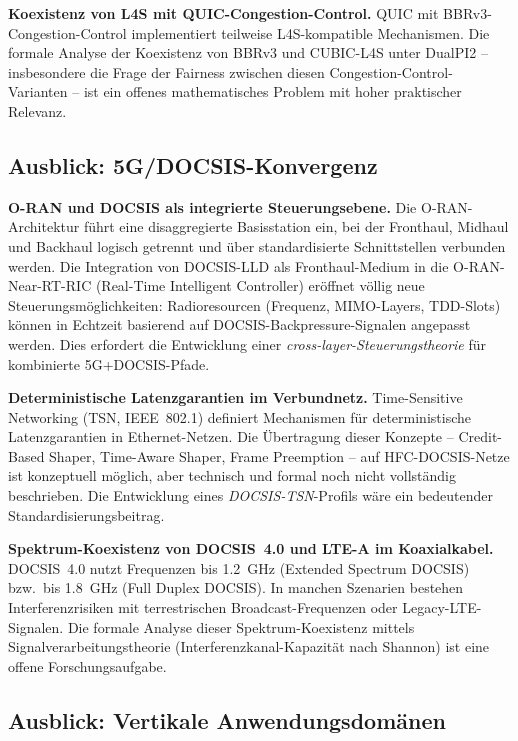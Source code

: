 ﻿\documentclass[a4paper,12pt]{article}
\theoremstyle{definition}
\begin{document}
\textbf{Koexistenz von L4S mit QUIC-Congestion-Control.}
QUIC \cite{iyengar2021rfc9000} mit BBRv3-Congestion-Control implementiert
teilweise L4S-kompatible Mechanismen. Die formale Analyse der Koexistenz
von BBRv3 und CUBIC-L4S unter DualPI2 -- insbesondere die Frage der
Fairness zwischen diesen Congestion-Control-Varianten -- ist ein offenes
mathematisches Problem mit hoher praktischer Relevanz.

\subsection{Ausblick: 5G/DOCSIS-Konvergenz}

\textbf{O-RAN und DOCSIS als integrierte Steuerungsebene.}
Die O-RAN-Architektur \cite{oran2022} f\"{u}hrt eine disaggregierte Basisstation
ein, bei der Fronthaul, Midhaul und Backhaul logisch getrennt und \"{u}ber
standardisierte Schnittstellen verbunden werden. Die Integration von
DOCSIS-LLD als Fronthaul-Medium in die O-RAN-Near-RT-RIC (Real-Time Intelligent
Controller) er\"{o}ffnet v\"{o}llig neue Steuerungsm\"{o}glichkeiten: Radioresourcen
(Frequenz, MIMO-Layers, TDD-Slots) k\"{o}nnen in Echtzeit basierend auf
DOCSIS-Backpressure-Signalen angepasst werden. Dies erfordert die Entwicklung
einer \emph{cross-layer-Steuerungstheorie} f\"{u}r kombinierte 5G+DOCSIS-Pfade.

\textbf{Deterministische Latenzgarantien im Verbundnetz.}
Time-Sensitive Networking (TSN, IEEE~802.1) definiert Mechanismen f\"{u}r
deterministische Latenzgarantien in Ethernet-Netzen. Die \"{U}bertragung dieser
Konzepte -- Credit-Based Shaper, Time-Aware Shaper, Frame Preemption --
auf HFC-DOCSIS-Netze ist konzeptuell m\"{o}glich, aber technisch und formal
noch nicht vollst\"{a}ndig beschrieben. Die Entwicklung eines \emph{DOCSIS-TSN}-Profils
w\"{a}re ein bedeutender Standardisierungsbeitrag.

\textbf{Spektrum-Koexistenz von DOCSIS~4.0 und LTE-A im Koaxialkabel.}
DOCSIS~4.0 nutzt Frequenzen bis 1.2~GHz (Extended Spectrum DOCSIS) bzw.\ bis
1.8~GHz (Full Duplex DOCSIS). In manchen Szenarien bestehen Interferenzrisiken
mit terrestrischen Broadcast-Frequenzen oder Legacy-LTE-Signalen. Die formale
Analyse dieser Spektrum-Koexistenz mittels Signalverarbeitungstheorie
(Interferenzkanal-Kapazität nach Shannon) ist eine offene Forschungsaufgabe.

\subsection{Ausblick: Vertikale Anwendungsdom\"{a}nen}
\end{document}

